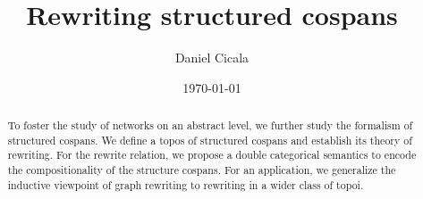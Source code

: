 \author{Daniel Cicala}
\title{Rewriting structured cospans}
\date{\today}
\address{Department of Mathematics and Physics\\
  University of New Haven}
\maketitle

\begin{abstract}
  To foster the study of networks on an abstract
  level, we further study the formalism of
  structured cospans.  We define a topos of
  structured cospans and establish its theory of
  rewriting. For the rewrite relation, we propose
  a double categorical semantics to encode the
  compositionality of the structure cospans. For
  an application, we generalize the inductive
  viewpoint of graph rewriting to rewriting in a
  wider class of topoi.
\end{abstract}
